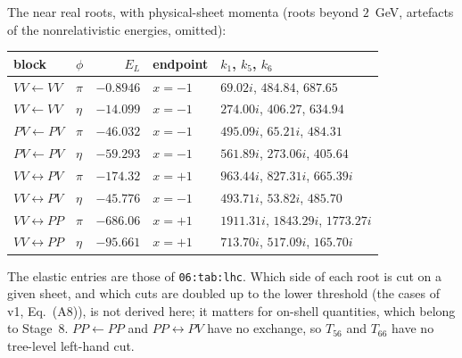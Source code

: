 \documentclass[11pt]{article}
\begin{document}
The near real roots, with physical-sheet momenta (roots beyond $2$~GeV, artefacts of the nonrelativistic energies, omitted):
\begin{center}
\begin{tabular}{llrll}
\toprule
block & $\phi$ & $E_L$ & endpoint & $k_1$, $k_5$, $k_6$\\
\midrule
$VV\leftarrow VV$ & $\pi$ & $-0.8946$ & $x=-1$ & $69.02i$, $484.84$, $687.65$\\
$VV\leftarrow VV$ & $\eta$ & $-14.099$ & $x=-1$ & $274.00i$, $406.27$, $634.94$\\
$PV\leftarrow PV$ & $\pi$ & $-46.032$ & $x=-1$ & $495.09i$, $65.21i$, $484.31$\\
$PV\leftarrow PV$ & $\eta$ & $-59.293$ & $x=-1$ & $561.89i$, $273.06i$, $405.64$\\
$VV\leftrightarrow PV$ & $\pi$ & $-174.32$ & $x=+1$ & $963.44i$, $827.31i$, $665.39i$\\
$VV\leftrightarrow PV$ & $\eta$ & $-45.776$ & $x=-1$ & $493.71i$, $53.82i$, $485.70$\\
$VV\leftrightarrow PP$ & $\pi$ & $-686.06$ & $x=+1$ & $1911.31i$, $1843.29i$, $1773.27i$\\
$VV\leftrightarrow PP$ & $\eta$ & $-95.661$ & $x=+1$ & $713.70i$, $517.09i$, $165.70i$\\
\bottomrule
\end{tabular}
\end{center}
The elastic entries are those of \texttt{06:tab:lhc}. Which side of each root is cut on a given sheet, and which cuts are doubled up to the lower threshold (the cases of \cite{Wu:2026wxb} v1, Eq.~(A8)), is not derived here; it matters for on-shell quantities, which belong to Stage~8. $PP\leftarrow PP$ and $PP\leftrightarrow PV$ have no exchange, so $T_{56}$ and $T_{66}$ have no tree-level left-hand cut.


\end{document}
